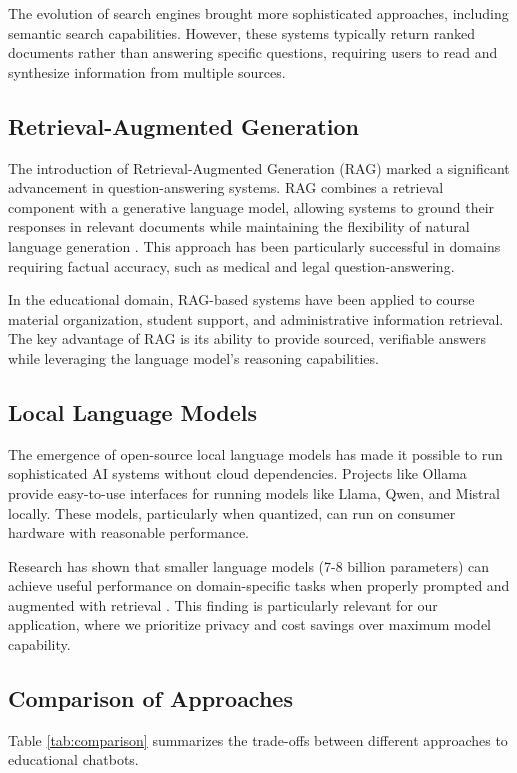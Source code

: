 \documentclass[conference]{IEEEtran}
\begin{document}
The evolution of search engines brought more sophisticated approaches, including semantic search capabilities. However, these systems typically return ranked documents rather than answering specific questions, requiring users to read and synthesize information from multiple sources.

\subsection{Retrieval-Augmented Generation}
The introduction of Retrieval-Augmented Generation (RAG) marked a significant advancement in question-answering systems. RAG combines a retrieval component with a generative language model, allowing systems to ground their responses in relevant documents while maintaining the flexibility of natural language generation \cite{rag}. This approach has been particularly successful in domains requiring factual accuracy, such as medical and legal question-answering.

In the educational domain, RAG-based systems have been applied to course material organization, student support, and administrative information retrieval. The key advantage of RAG is its ability to provide sourced, verifiable answers while leveraging the language model's reasoning capabilities.

\subsection{Local Language Models}
The emergence of open-source local language models has made it possible to run sophisticated AI systems without cloud dependencies. Projects like Ollama \cite{ollama} provide easy-to-use interfaces for running models like Llama, Qwen, and Mistral locally. These models, particularly when quantized, can run on consumer hardware with reasonable performance.

Research has shown that smaller language models (7-8 billion parameters) can achieve useful performance on domain-specific tasks when properly prompted and augmented with retrieval \cite{local-llms}. This finding is particularly relevant for our application, where we prioritize privacy and cost savings over maximum model capability.

\subsection{Comparison of Approaches}
Table \ref{tab:comparison} summarizes the trade-offs between different approaches to educational chatbots.
\end{document}
